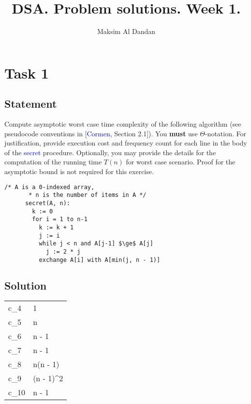 \documentclass{article}
\title{DSA. Problem solutions. Week 1.}
\author{Maksim Al Dandan}
\begin{document}
\maketitle

\section{Task 1}

\subsection{Statement}

Compute asymptotic worst case time complexity of the following algorithm (see pseudocode conventions in [\textcolor{blue}{Cormen}, Section 2.1]). You \textbf{must} use \(\Theta\)-notation. For justification, provide execution cost and frequency count for each line in the body of the \textcolor{blue}{secret} procedure. Optionally, you may provide the details for the computation of the running time \(T(n)\) for worst case scenario. Proof for the asymptotic bound is not required for this exercise.

\begin{lstlisting}[mathescape=true]
      /* A is a 0-indexed array,
       * n is the number of items in A */
      secret(A, n):
        k := 0
        for i = 1 to n-1
          k := k + 1
          j := i
          while j < n and A[j-1] $\ge$ A[j]
            j := 2 * j
          exchange A[i] with A[min(j, n - 1)]
\end{lstlisting}

\subsection{Solution}
\begin{table}[h!]
    \centering
    \begin{tabular}{| L | L |}
    \hline
     &  \\
    \hline
    c_4 & 1 \\
    c_5 &  n \\
    c_6 &  n - 1 \\
    c_7 &  n - 1 \\
    c_8 &  n(n - 1) \\
    c_9 &  (n - 1)^2 \\
    c_{10} &  n - 1 \\
    \hline
    \end{tabular}
\end{table}
\end{document}
